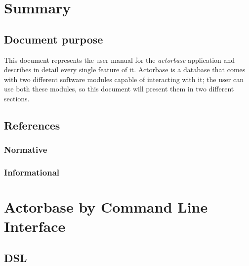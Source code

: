 \documentclass{scalatekids-article}
\begin{document}
\section{Summary}
\subsection{Document purpose}
This document represents the user manual for the \textit{actorbase} application and describes in detail every single feature of it.
Actorbase is a database that comes with two different software modules capable of interacting with it; the user can use both these modules, so this document will present them in two different sections.

\prodPurpose

\subsection{References}

\subsubsection{Normative} %

\subsubsection{Informational} %




\section{Actorbase by Command Line Interface}

\subsection{DSL} %
\end{document}
